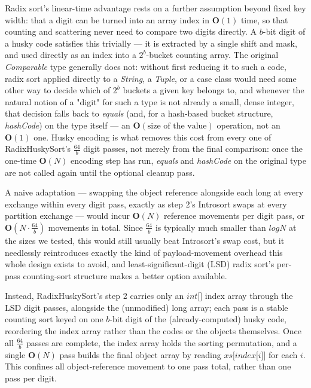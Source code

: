 \documentclass[twoside,leqno,twocolumn]{article}
\begin{document}
Radix sort's linear-time advantage rests on a further assumption beyond fixed key width:
that a digit can be turned into an array index in $\textbf{O}(1)$ time,
so that counting and scattering never need to compare two digits directly.
A $b$-bit digit of a husky code satisfies this trivially —
it is extracted by a single shift and mask, and used directly as an index into a $2^b$-bucket counting array.
The original \textit{Comparable} type generally does not:
without first reducing it to such a code, radix sort applied directly to a \textit{String},
a \textit{Tuple}, or a case class would need some other way to decide which of $2^b$ buckets a given key belongs to,
and whenever the natural notion of a "digit" for such a type is not already a small, dense integer,
that decision falls back to \textit{equals} (and, for a hash-based bucket structure,
\textit{hashCode}) on the type itself — an $\textbf{O}(\text{size of the value})$ operation, not an $\textbf{O}(1)$ one.
Husky encoding is what removes this cost from every one of RadixHuskySort's $\frac{64}{b}$ digit passes,
not merely from the final comparison:
once the one-time $\textbf{O}(N)$ encoding step has run,
\textit{equals} and \textit{hashCode} on the original type are not called again until the optional cleanup pass.

A naive adaptation — swapping the object reference alongside each long at every exchange within every digit pass,
exactly as step 2's Introsort swaps at every partition exchange —
would incur $\textbf{O}(N)$ reference movements per digit pass, or $\textbf{O}(N \cdot \frac{64}{b})$ movements in total.
Since $\frac{64}{b}$ is typically much smaller than $log N$ at the sizes we tested,
this would still usually beat Introsort's swap cost,
but it needlessly reintroduces exactly the kind of payload-movement overhead this whole design exists to avoid,
and least-significant-digit (LSD) radix sort's per-pass counting-sort structure makes a better option available.

Instead, RadixHuskySort's step 2 carries only an $\textit{int[]}$ index array through the LSD digit passes,
alongside the (unmodified) long array;
each pass is a stable counting sort keyed on one $b$-bit digit of the (already-computed) husky code,
reordering the index array rather than the codes or the objects themselves.
Once all $\frac{64}{b}$ passes are complete, the index array holds the sorting permutation,
and a single $\textbf{O}(N)$ pass builds the final object array by reading $\textit{xs[index[i]]}$ for each $i$.
This confines all object-reference movement to one pass total, rather than one pass per digit.
\end{document}
